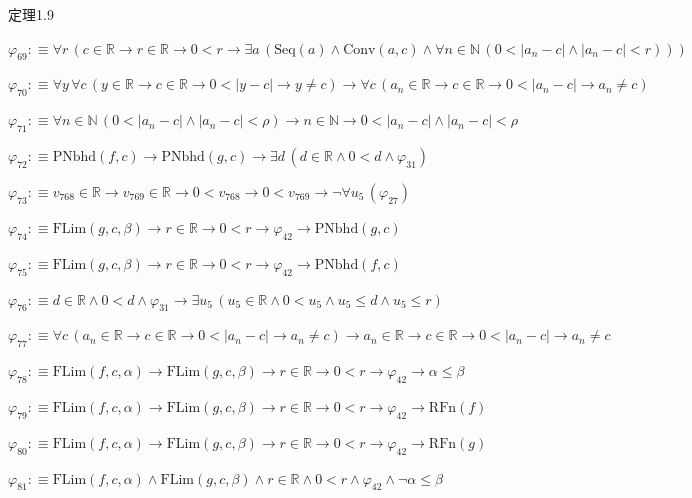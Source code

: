 \begin{fullproof}{定理1.9}
\begin{abbrevlist}
\item $\varphi_{69} :\equiv \forall r\,(c \in \mathbb{R} \to r \in \mathbb{R} \to 0 < r \to \exists a\,(\mathrm{Seq}(a) \land \mathrm{Conv}(a,c) \land \forall n \in \mathbb{N}\,(0 < \lvert a_{n} - c \rvert \land \lvert a_{n} - c \rvert < r)))$
\item $\varphi_{70} :\equiv \forall y\,\forall c\,(y \in \mathbb{R} \to c \in \mathbb{R} \to 0 < \lvert y - c \rvert \to y \neq c) \to \forall c\,(a_{n} \in \mathbb{R} \to c \in \mathbb{R} \to 0 < \lvert a_{n} - c \rvert \to a_{n} \neq c)$
\item $\varphi_{71} :\equiv \forall n \in \mathbb{N}\,(0 < \lvert a_{n} - c \rvert \land \lvert a_{n} - c \rvert < \rho) \to n \in \mathbb{N} \to 0 < \lvert a_{n} - c \rvert \land \lvert a_{n} - c \rvert < \rho$
\item $\varphi_{72} :\equiv \mathrm{PNbhd}(f,c) \to \mathrm{PNbhd}(g,c) \to \exists d\,(d \in \mathbb{R} \land 0 < d \land \varphi_{31})$
\item $\varphi_{73} :\equiv v_{768} \in \mathbb{R} \to v_{769} \in \mathbb{R} \to 0 < v_{768} \to 0 < v_{769} \to \neg \forall u_{5}\,(\varphi_{27})$
\item $\varphi_{74} :\equiv \mathrm{FLim}(g,c,\beta) \to r \in \mathbb{R} \to 0 < r \to \varphi_{42} \to \mathrm{PNbhd}(g,c)$
\item $\varphi_{75} :\equiv \mathrm{FLim}(g,c,\beta) \to r \in \mathbb{R} \to 0 < r \to \varphi_{42} \to \mathrm{PNbhd}(f,c)$
\item $\varphi_{76} :\equiv d \in \mathbb{R} \land 0 < d \land \varphi_{31} \to \exists u_{5}\,(u_{5} \in \mathbb{R} \land 0 < u_{5} \land u_{5} \leq d \land u_{5} \leq r)$
\item $\varphi_{77} :\equiv \forall c\,(a_{n} \in \mathbb{R} \to c \in \mathbb{R} \to 0 < \lvert a_{n} - c \rvert \to a_{n} \neq c) \to a_{n} \in \mathbb{R} \to c \in \mathbb{R} \to 0 < \lvert a_{n} - c \rvert \to a_{n} \neq c$
\item $\varphi_{78} :\equiv \mathrm{FLim}(f,c,\alpha) \to \mathrm{FLim}(g,c,\beta) \to r \in \mathbb{R} \to 0 < r \to \varphi_{42} \to \alpha \leq \beta$
\item $\varphi_{79} :\equiv \mathrm{FLim}(f,c,\alpha) \to \mathrm{FLim}(g,c,\beta) \to r \in \mathbb{R} \to 0 < r \to \varphi_{42} \to \mathrm{RFn}(f)$
\item $\varphi_{80} :\equiv \mathrm{FLim}(f,c,\alpha) \to \mathrm{FLim}(g,c,\beta) \to r \in \mathbb{R} \to 0 < r \to \varphi_{42} \to \mathrm{RFn}(g)$
\item $\varphi_{81} :\equiv \mathrm{FLim}(f,c,\alpha) \land \mathrm{FLim}(g,c,\beta) \land r \in \mathbb{R} \land 0 < r \land \varphi_{42} \land \neg \alpha \leq \beta$

\end{abbrevlist}
\end{fullproof}
